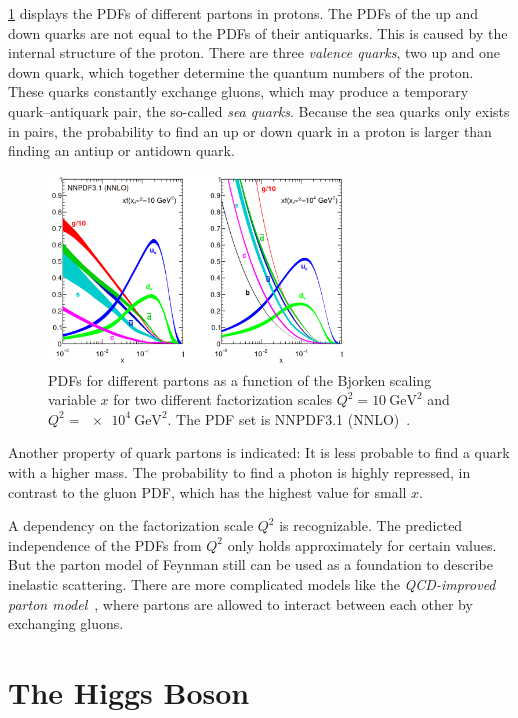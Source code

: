 \cref{fig:theory:pdfs} displays the PDFs of different partons in protons.
The PDFs of the up and down quarks are not equal to the PDFs of their antiquarks.
This is caused by the internal structure of the proton.
There are three \emph{valence quarks}, two up and one down quark, which together determine the quantum numbers of the proton.
These quarks constantly exchange gluons, which may produce a temporary quark--antiquark pair, the so-called \emph{sea quarks}.
Because the sea quarks only exists in pairs, the probability to find an up or down quark in a proton is larger than finding an
antiup or antidown quark.
\begin{figure}[htb]
	\centering
	\includegraphics[width=0.7\textwidth]{./figures/theory/nnpdf.png}
	\caption{PDFs for different partons as a function of the Bjorken scaling variable $x$
             for two different factorization scales $Q^2 = \SI{10}{\GeV\squared}$ and $Q^2 = \SI{e4}{\GeV\squared}$.
			 The PDF set is NNPDF3.1 (NNLO)~\cite{nnpdf3.1}.}\label{fig:theory:pdfs}
\end{figure}
Another property of quark partons is indicated: It is less probable to find a quark with a higher mass.
The probability to find a photon is highly repressed, in contrast to the gluon PDF, which has the highest value for small $x$.

A dependency on the factorization scale $Q^2$ is recognizable.
The predicted independence of the PDFs from $Q^2$ only holds approximately for certain values.
But the parton model of Feynman still can be used as a foundation to describe inelastic scattering.
There are more complicated models like the \emph{QCD-improved parton model}~\cite{col98}, where
partons are allowed to interact between each other by exchanging gluons.


\section{The Higgs Boson}\label{sec:theory:higgs}

